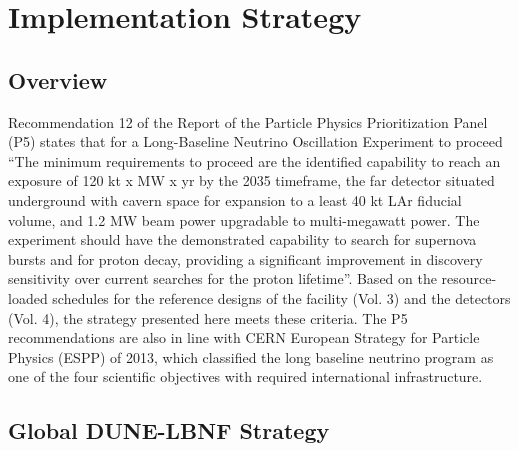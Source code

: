 \chapter{Implementation Strategy}
\label{ch:detectors-strategy}

\section{Overview}

Recommendation 12 of the Report of the Particle Physics Prioritization Panel (P5) 
states that for a Long-Baseline Neutrino Oscillation Experiment to proceed ``The 
minimum requirements to proceed are the identified capability to reach an exposure 
of 120 kt x MW x yr by the 2035 timeframe, the far detector situated underground 
with cavern space for expansion to a least 40 kt LAr fiducial volume, and 1.2 MW 
beam power upgradable to multi-megawatt power. The experiment should have the demonstrated 
capability to search for supernova bursts and for proton decay, providing a significant 
improvement in discovery sensitivity over current searches for the proton lifetime''. 
Based on the resource-loaded schedules for the reference designs of the facility 
(Vol. 3) and the detectors (Vol. 4), the strategy presented here meets these criteria. 
The P5 recommendations are also in line with CERN European Strategy for Particle 
Physics (ESPP) of 2013, which classified the long baseline neutrino program as 
one of the four scientific objectives with required international infrastructure.

\section{Global DUNE-LBNF Strategy}

